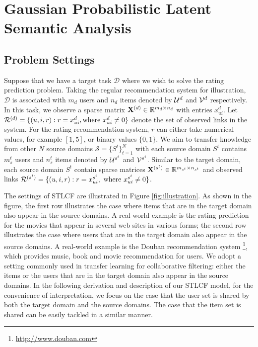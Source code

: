 \chapter{Gaussian Probabilistic Latent Semantic Analysis}
\label{chp:gplsa}

\hspace{0.1in}
\section{Problem Settings}

Suppose that we have a target task $\mathcal{D}$ where we wish to solve the rating prediction problem. Taking the regular recommendation system for illustration, $\mathcal{D}$ is associated with $m_{d}$ users and $n_{d}$ items denoted by $\mathcal{U}^{d}$ and $\mathcal{V}^{d}$ respectively. In this task, we observe a sparse matrix $\mathbf{X}^{(d)}\in \mathbb{R}^{m_d\times n_{d}}$ with entries $x^d_{ui}$. Let $\mathcal{R}^{(d)}=\{(u,i,r):r=x^d_{ui},\mbox{where } x^d_{ui}\ne 0\}$ denote the set of observed links in the system. For the rating recommendation system, $r$ can either take numerical values, for example $[1,5]$, or binary values $\{0, 1\}$. We aim to transfer knowledge from other $N$ source domains $\mathcal{S}=\{S^t\}_{t=1}^{N}$ with each source domain $S^t$ contains $m^t_s$ users and $n^t_s$ items denoted by $\mathcal{U}^{s^t}$ and $\mathcal{V}^{s^t}$. Similar to the target domain, each source domain $S^t$ contain sparse matrices $\mathbf{X}^{(s^t)}\in \mathbb{R}^{m_{s^t}\times n_{s^t}}$ and observed links $\mathcal{R}^{(s^t)}=\{(u,i,r):r=x^{s^t}_{ui},\mbox{ where } x^{s^t}_{ui}\ne 0\}$.

The settings of STLCF are illustrated in Figure \ref{fig:illustration}. As shown in the figure, the first row illustrates the case where items that are in the target domain also appear in the source domains. A real-world example is the rating prediction for the movies that appear in several web sites in various forms; the second row illustrates the case where users that are in the target domain also appear in the source domains. A real-world example is the Douban recommendation system \footnote{\url{http://www.douban.com}}, which provides music, book and movie recommendation for users. We adopt a setting commonly used in transfer learning for collaborative filtering: either the items or the users that are in the target domain also appear in the source domains. In the following derivation and description of our STLCF model, for the convenience of interpretation, we focus on the case that the user set is shared by both the target domain and the source domains.
The case that the item set is shared can be easily tackled in a similar manner.

